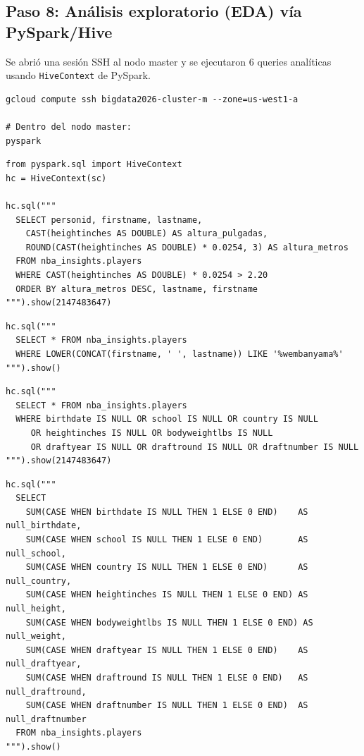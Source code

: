 \documentclass[12pt, letterpaper]{article}
\begin{document}
\subsection{Paso 8: Análisis exploratorio (EDA) vía PySpark/Hive}

Se abrió una sesión SSH al nodo master y se ejecutaron 6 queries analíticas usando \texttt{HiveContext} de PySpark.

\begin{lstlisting}[style=codestyle, caption={Conexión SSH al master y apertura de sesión PySpark}]
gcloud compute ssh bigdata2026-cluster-m --zone=us-west1-a

# Dentro del nodo master:
pyspark
\end{lstlisting}

\begin{lstlisting}[style=codestyle, caption={Q1 --- Jugadores con altura mayor a 2.20 m}]
from pyspark.sql import HiveContext
hc = HiveContext(sc)

hc.sql("""
  SELECT personid, firstname, lastname,
    CAST(heightinches AS DOUBLE) AS altura_pulgadas,
    ROUND(CAST(heightinches AS DOUBLE) * 0.0254, 3) AS altura_metros
  FROM nba_insights.players
  WHERE CAST(heightinches AS DOUBLE) * 0.0254 > 2.20
  ORDER BY altura_metros DESC, lastname, firstname
""").show(2147483647)
\end{lstlisting}

\begin{lstlisting}[style=codestyle, caption={Q2 --- Búsqueda de Victor Wembanyama}]
hc.sql("""
  SELECT * FROM nba_insights.players
  WHERE LOWER(CONCAT(firstname, ' ', lastname)) LIKE '%wembanyama%'
""").show()
\end{lstlisting}

\begin{lstlisting}[style=codestyle, caption={Q3 --- Jugadores con al menos un campo nulo}]
hc.sql("""
  SELECT * FROM nba_insights.players
  WHERE birthdate IS NULL OR school IS NULL OR country IS NULL
     OR heightinches IS NULL OR bodyweightlbs IS NULL
     OR draftyear IS NULL OR draftround IS NULL OR draftnumber IS NULL
""").show(2147483647)
\end{lstlisting}

\begin{lstlisting}[style=codestyle, caption={Q4 --- Conteo de nulos por atributo}]
hc.sql("""
  SELECT
    SUM(CASE WHEN birthdate IS NULL THEN 1 ELSE 0 END)    AS null_birthdate,
    SUM(CASE WHEN school IS NULL THEN 1 ELSE 0 END)       AS null_school,
    SUM(CASE WHEN country IS NULL THEN 1 ELSE 0 END)      AS null_country,
    SUM(CASE WHEN heightinches IS NULL THEN 1 ELSE 0 END) AS null_height,
    SUM(CASE WHEN bodyweightlbs IS NULL THEN 1 ELSE 0 END) AS null_weight,
    SUM(CASE WHEN draftyear IS NULL THEN 1 ELSE 0 END)    AS null_draftyear,
    SUM(CASE WHEN draftround IS NULL THEN 1 ELSE 0 END)   AS null_draftround,
    SUM(CASE WHEN draftnumber IS NULL THEN 1 ELSE 0 END)  AS null_draftnumber
  FROM nba_insights.players
""").show()
\end{lstlisting}
\end{document}
